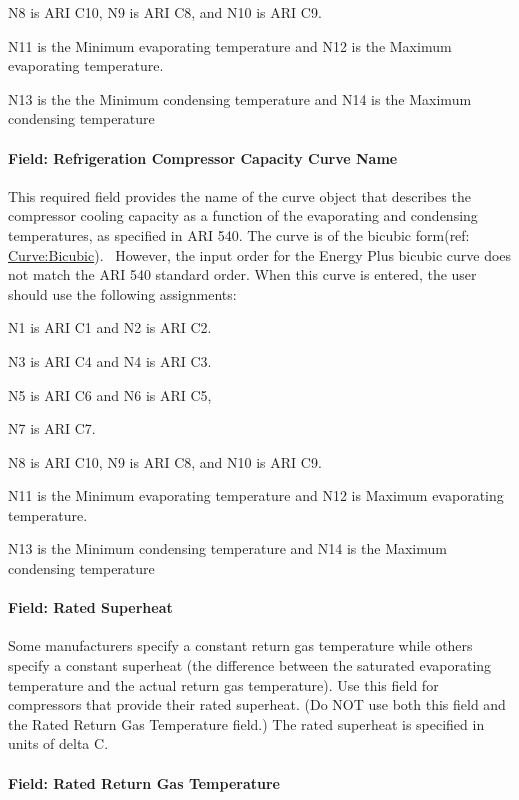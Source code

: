N8 is ARI C10, N9 is ARI C8, and N10 is ARI C9.

N11 is the Minimum evaporating temperature and N12 is the Maximum evaporating temperature.

N13 is the the Minimum condensing temperature and N14 is the Maximum condensing temperature

\paragraph{Field: Refrigeration Compressor Capacity Curve Name}\label{field-refrigeration-compressor-capacity-curve-name}

This required field provides the name of the curve object that describes the compressor cooling capacity as a function of the evaporating and condensing temperatures, as specified in ARI 540. The curve is of the bicubic form(ref: \hyperref[curvebicubic]{Curve:Bicubic}).~ However, the input order for the Energy Plus bicubic curve does not match the ARI 540 standard order. When this curve is entered, the user should use the following assignments:

N1 is ARI C1 and N2 is ARI C2.

N3 is ARI C4 and N4 is ARI C3.

N5 is ARI C6 and N6 is ARI C5,

N7 is ARI C7.

N8 is ARI C10, N9 is ARI C8, and N10 is ARI C9.

N11 is the Minimum evaporating temperature and N12 is Maximum evaporating temperature.

N13 is the Minimum condensing temperature and N14 is the Maximum condensing temperature

\paragraph{Field: Rated Superheat}\label{field-rated-superheat}

Some manufacturers specify a constant return gas temperature while others specify a constant superheat (the difference between the saturated evaporating temperature and the actual return gas temperature). Use this field for compressors that provide their rated superheat. (Do NOT use both this field and the Rated Return Gas Temperature field.) The rated superheat is specified in units of delta C.

\paragraph{Field: Rated Return Gas Temperature}\label{field-rated-return-gas-temperature}

